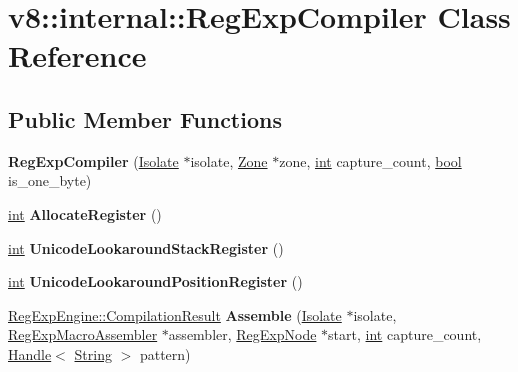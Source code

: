 \hypertarget{classv8_1_1internal_1_1RegExpCompiler}{}\section{v8\+:\+:internal\+:\+:Reg\+Exp\+Compiler Class Reference}
\label{classv8_1_1internal_1_1RegExpCompiler}
\subsection*{Public Member Functions}
\begin{DoxyCompactItemize}
\item 
\mbox{\label{classv8_1_1internal_1_1RegExpCompiler_ae554d39de9e3094998585a950bd69190}} 
{\bfseries Reg\+Exp\+Compiler} (\mbox{\hyperlink{classv8_1_1internal_1_1Isolate}{Isolate}} $\ast$isolate, \mbox{\hyperlink{classv8_1_1internal_1_1Zone}{Zone}} $\ast$zone, \mbox{\hyperlink{classint}{int}} capture\+\_\+count, \mbox{\hyperlink{classbool}{bool}} is\+\_\+one\+\_\+byte)
\item 
\mbox{\label{classv8_1_1internal_1_1RegExpCompiler_ab202d545cb1d4f3f57b85ecb74c9f0dc}} 
\mbox{\hyperlink{classint}{int}} {\bfseries Allocate\+Register} ()
\item 
\mbox{\label{classv8_1_1internal_1_1RegExpCompiler_a223a98e40c9dd7c49eb1c6458f849803}} 
\mbox{\hyperlink{classint}{int}} {\bfseries Unicode\+Lookaround\+Stack\+Register} ()
\item 
\mbox{\label{classv8_1_1internal_1_1RegExpCompiler_aa1ad425dda7f02a1cf502d1e30114c5a}} 
\mbox{\hyperlink{classint}{int}} {\bfseries Unicode\+Lookaround\+Position\+Register} ()
\item 
\mbox{\label{classv8_1_1internal_1_1RegExpCompiler_a591c4d68062152497dbd465c6d037841}} 
\mbox{\hyperlink{structv8_1_1internal_1_1RegExpEngine_1_1CompilationResult}{Reg\+Exp\+Engine\+::\+Compilation\+Result}} {\bfseries Assemble} (\mbox{\hyperlink{classv8_1_1internal_1_1Isolate}{Isolate}} $\ast$isolate, \mbox{\hyperlink{classv8_1_1internal_1_1RegExpMacroAssembler}{Reg\+Exp\+Macro\+Assembler}} $\ast$assembler, \mbox{\hyperlink{classv8_1_1internal_1_1RegExpNode}{Reg\+Exp\+Node}} $\ast$start, \mbox{\hyperlink{classint}{int}} capture\+\_\+count, \mbox{\hyperlink{classv8_1_1internal_1_1Handle}{Handle}}$<$ \mbox{\hyperlink{classv8_1_1internal_1_1String}{String}} $>$ pattern)

\end{DoxyCompactItemize}
